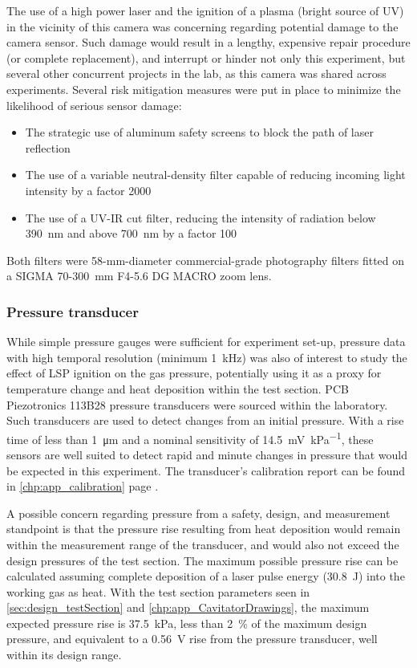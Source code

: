                 The use of a high power laser and the ignition of a plasma (bright source of UV) in the vicinity of this camera was concerning regarding potential damage to the camera sensor. Such damage would result in a lengthy, expensive repair procedure (or complete replacement), and interrupt or hinder not only this experiment, but several other concurrent projects in the lab, as this camera was shared across experiments. Several risk mitigation measures were put in place to minimize the likelihood of serious sensor damage:
                \begin{itemize}
                    \item The strategic use of aluminum safety screens to block the path of laser reflection
                    \item The use of a variable neutral-density filter capable of reducing incoming light intensity by a factor 2000
                    \item The use of a UV-IR cut filter, reducing the intensity of radiation below 390~nm and above 700~nm by a factor 100
                \end{itemize}
                Both filters were 58-mm-diameter commercial-grade photography filters fitted on a SIGMA 70-300~mm F4-5.6 DG MACRO zoom lens. 

                

            \subsubsection*{Pressure transducer} \label{sec:design_pressuresensor}
                While simple pressure gauges were sufficient for experiment set-up, pressure data with high temporal resolution (minimum \qty{1}{kHz}) was also of interest to study the effect of LSP ignition on the gas pressure, potentially using it as a proxy for temperature change and heat deposition within the test section. PCB Piezotronics 113B28 pressure transducers were sourced within the laboratory. Such transducers are used to detect changes from an initial pressure. With a rise time of less than \qty{1}{\um} and a nominal sensitivity of \qty{14.5}{mV\per kPa}, these sensors are well suited to detect rapid and minute changes in pressure that would be expected in this experiment. The transducer's calibration report can be found in \autoref{chp:app_calibration} page \pageref*{ds:pcbPressure}.

                A possible concern regarding pressure from a safety, design, and measurement standpoint is that the pressure rise resulting from heat deposition would remain within the measurement range of the transducer, and would also not exceed the design pressures of the test section. The maximum possible pressure rise can be calculated assuming complete deposition of a laser pulse energy (\qty{30.8}{J}) into the working gas as heat. With the test section parameters seen in \autoref{sec:design_testSection} and \autoref{chp:app_CavitatorDrawings}, the maximum expected pressure rise is \qty{37.5}{kPa}, less than 2~\% of the maximum design pressure, and equivalent to a \qty{0.56}{V} rise from the pressure transducer, well within its design range.

